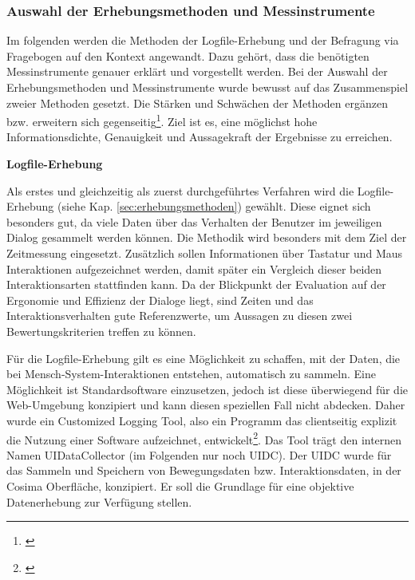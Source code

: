 
\subsubsection{Auswahl der Erhebungsmethoden und Messinstrumente}
Im folgenden werden die Methoden der Logfile-Erhebung und der Befragung via Fragebogen auf den Kontext angewandt. Dazu gehört, dass die benötigten Messinstrumente genauer erklärt und vorgestellt werden. Bei der Auswahl der Erhebungsmethoden und Messinstrumente wurde bewusst auf das Zusammenspiel zweier Methoden gesetzt. Die Stärken und Schwächen der Methoden ergänzen bzw. erweitern sich gegenseitig\footnote{\cite[vgl.][5\psq]{Priemer2004}}. Ziel ist es, eine möglichst hohe Informationsdichte, Genauigkeit und Aussagekraft der Ergebnisse zu erreichen. 

\textbf{Logfile-Erhebung}

Als erstes und gleichzeitig als zuerst durchgeführtes Verfahren wird die Logfile-Erhebung (siehe Kap. \ref{sec:erhebungsmethoden}) gewählt. Diese eignet sich besonders gut, da viele Daten über das Verhalten der Benutzer im jeweiligen Dialog gesammelt werden können. Die Methodik wird besonders mit dem Ziel der Zeitmessung eingesetzt. Zusätzlich sollen Informationen über Tastatur und Maus Interaktionen aufgezeichnet werden, damit später ein Vergleich dieser beiden Interaktionsarten stattfinden kann. Da der Blickpunkt der Evaluation auf der Ergonomie und Effizienz der Dialoge liegt, sind Zeiten und das Interaktionsverhalten gute Referenzwerte, um Aussagen zu diesen zwei Bewertungskriterien treffen zu können.

Für die Logfile-Erhebung gilt es eine Möglichkeit zu schaffen, mit der Daten, die bei Mensch-System-Interaktionen entstehen, automatisch zu sammeln. Eine Möglichkeit ist Standardsoftware einzusetzen, jedoch ist diese überwiegend für die Web-Umgebung konzipiert und kann diesen speziellen Fall nicht abdecken. Daher wurde ein Customized Logging Tool, also ein Programm das clientseitig explizit die Nutzung einer Software aufzeichnet, entwickelt\footnote{\cite[vgl.][3]{Priemer2004}}. Das Tool trägt den internen Namen UIDataCollector (im Folgenden nur noch UIDC). Der UIDC wurde für das Sammeln und Speichern von Bewegungsdaten bzw. Interaktionsdaten, in der Cosima Oberfläche, konzipiert. Er soll die Grundlage für eine objektive Datenerhebung zur Verfügung stellen.


